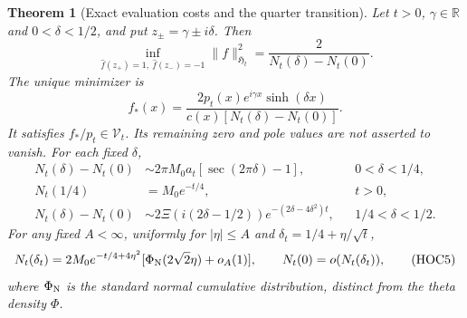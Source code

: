 \documentclass[11pt]{article}
\newtheorem{theorem}{Theorem}
\theoremstyle{remark}\newtheorem{remark}[theorem]{Remark}
\newcommand{\R}{\mathbb R}
\begin{document}
\begin{theorem}[Exact evaluation costs and the quarter transition]
\label{thm:heat-evaluation-cost}
Let $t>0$, $\gamma\in\R$ and $0<\delta<1/2$, and put
$z_\pm=\gamma\pm i\delta$. Then
\[
 \inf_{\widehat f(z_+)=1,\ \widehat f(z_-)=-1}
        \|f\|_{\mathfrak H_t}^2=\frac{2}{N_t(\delta)-N_t(0)}.
                                                               \tag{HOC2}
\]
The unique minimizer is
\[
 f_*(x)=\frac{2p_t(x)e^{i\gamma x}\sinh(\delta x)}
                         {c(x)[N_t(\delta)-N_t(0)]}.
                                                               \tag{HOC3}
\]
It satisfies $f_*/p_t\in\mathcal V_t$. Its remaining zero and
pole values are not asserted to vanish. For each fixed $\delta$,
\[
\begin{aligned}
 N_t(\delta)-N_t(0)&\sim2\pi M_0a_t[\sec(2\pi\delta)-1],
                                      &&0<\delta<1/4,\\
 N_t(1/4)&=M_0e^{-t/4}, &&t>0,\\
 N_t(\delta)-N_t(0)&\sim2\Xi(i(2\delta-1/2))
                             e^{-(2\delta-4\delta^2)t},
                                      &&1/4<\delta<1/2.
\end{aligned}                                                \tag{HOC4}
\]
For any fixed $A<\infty$, uniformly for $|\eta|\le A$ and
$\delta_t=1/4+\eta/\sqrt t$,
\[
 N_t(\delta_t)=2M_0e^{-t/4+4\eta^2}
           [\Phi_{\rm N}(2\sqrt2\eta)+o_A(1)],\qquad
 N_t(0)=o(N_t(\delta_t)),                                    \tag{HOC5}
\]
where $\Phi_{\rm N}$ is the standard normal cumulative distribution,
distinct from the theta density $\Phi$.
\end{theorem}
\end{document}
